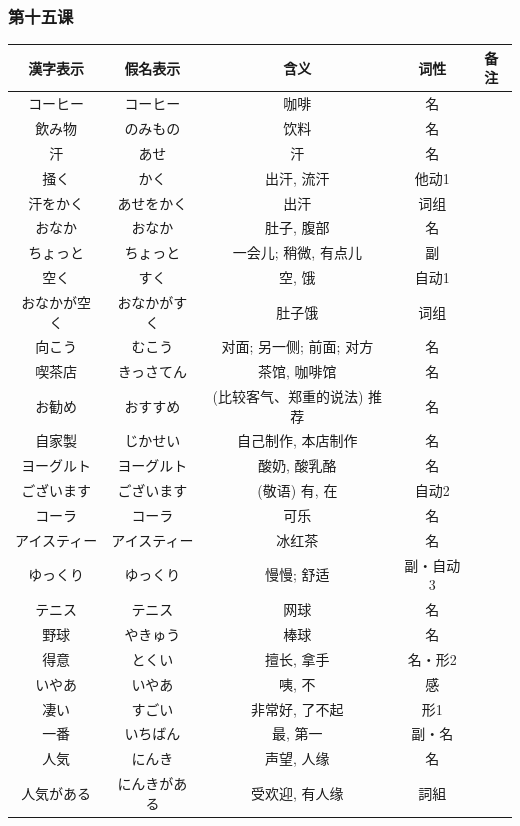 \subsubsection{第十五课}
\begin{longtable}{|c|c|c|c|c|}
    \hline
漢字表示 & 假名表示  & 含义 & 词性 & 备注 \\ \hline\hline  
コーヒー & コーヒー & 咖啡 & 名 & \\ \hline
飲み物 & のみもの & 饮料 & 名 & \\ \hline
汗 & あせ & 汗 & 名 & \\ \hline
掻く & かく & 出汗, 流汗 & 他动1 & \\ \hline
汗をかく & あせをかく & 出汗 & 词组 & \\ \hline
おなか & おなか & 肚子, 腹部 & 名 & \\ \hline
ちょっと & ちょっと & 一会儿; 稍微, 有点儿 & 副 & \\ \hline
空く & すく & 空, 饿 & 自动1 & \\ \hline
おなかが空く & おなかがすく & 肚子饿 & 词组 & \\ \hline
向こう & むこう & 对面; 另一侧; 前面; 对方 & 名 & \\ \hline
喫茶店 & きっさてん & 茶馆, 咖啡馆 & 名 & \\ \hline
お勧め & おすすめ & (比较客气、郑重的说法) 推荐 & 名 & \\ \hline
自家製 & じかせい & 自己制作, 本店制作 & 名 & \\ \hline
ヨーグルト & ヨーグルト & 酸奶, 酸乳酪 & 名 & \\ \hline
ございます & ございます & (敬语) 有, 在 & 自动2 & \\ \hline
コーラ & コーラ & 可乐 & 名 & \\ \hline
アイスティー & アイスティー & 冰红茶 & 名 & \\ \hline
ゆっくり & ゆっくり & 慢慢; 舒适 & 副・自动3 & \\ \hline
テニス & テニス& 网球 & 名 & \\ \hline
野球 & やきゅう & 棒球 & 名 & \\ \hline
得意 & とくい& 擅长, 拿手 & 名・形2 & \\ \hline
いやあ & いやあ & 咦, 不 & 感 & \\ \hline
凄い & すごい & 非常好, 了不起 & 形1 & \\ \hline
一番 & いちばん & 最, 第一 & 副・名 & \\\hline
人気 & にんき & 声望, 人缘 & 名 & \\ \hline
人気がある & にんきがある & 受欢迎, 有人缘 & 詞組 & \\ \hline

\end{longtable}
